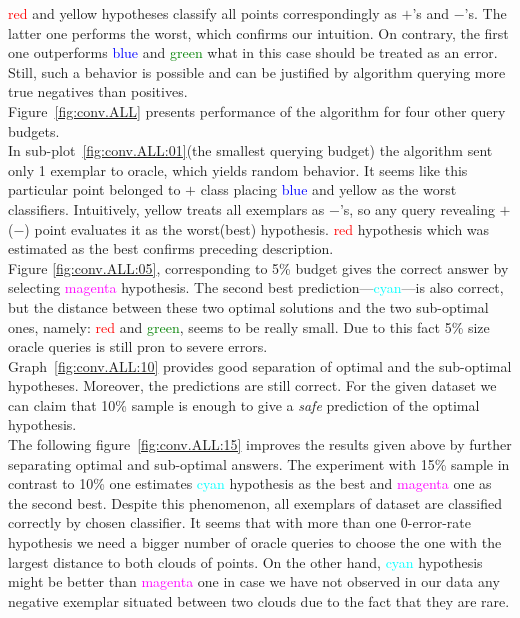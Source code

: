 \documentclass[12pt, a4paper, pdflatex, leqno, twoside]{report}
\begin{document}
\textcolor{red}{red} and \textcolor{Dandelion}{yellow} hypotheses classify all 
points correspondingly as $+$'s and $-$'s. The latter one performs the worst, 
which confirms our intuition. On contrary, the first one outperforms 
\textcolor{blue}{blue} and \textcolor{green}{green} what in this case should be 
treated as an error. Still, such a behavior is possible and can be justified by algorithm 
querying more true negatives than positives.\\

Figure~\ref{fig:conv.ALL} presents performance of the algorithm for four other query budgets.\\ 
In sub-plot~\ref{fig:conv.ALL:01}(the smallest querying 
budget) the algorithm sent only 1 exemplar to oracle, which yields random 
behavior. It seems like this particular point belonged to $+$ class placing 
\textcolor{blue}{blue} and \textcolor{Dandelion}{yellow} as the worst 
classifiers. Intuitively, \textcolor{Dandelion}{yellow} treats all exemplars 
as $-$'s, so any query revealing $+$($-$) point evaluates it as the worst(best) hypothesis. \textcolor{red}{red} hypothesis which was estimated as the best confirms preceding description. \\
Figure \ref{fig:conv.ALL:05}, corresponding to 5\% budget gives the correct 
answer by selecting \textcolor{magenta}{magenta} hypothesis. The second best 
prediction---\textcolor{cyan}{cyan}---is also correct, but the distance between 
these two optimal solutions and the two sub-optimal ones, namely: \textcolor{red}{red} 
and \textcolor{green}{green}, seems to be really small. Due to this fact 5\% 
size oracle queries is still pron to severe errors.\\
Graph~\ref{fig:conv.ALL:10} provides good separation of optimal and the sub-optimal 
hypotheses. Moreover, the predictions are still correct. For the given dataset we 
can claim that 10\% sample is enough to give a \emph{safe} prediction of the 
optimal hypothesis.\\
The following figure~\ref{fig:conv.ALL:15} improves the results given above by 
further separating optimal and sub-optimal answers. The experiment with 15\% sample 
in contrast to 10\% one estimates \textcolor{cyan}{cyan} hypothesis as the best 
and \textcolor{magenta}{magenta} one as the second best. Despite this 
phenomenon, all exemplars of dataset are classified correctly by chosen 
classifier. It seems that with more than one 0-error-rate hypothesis we need 
a bigger number of oracle queries to choose the one with the largest distance to both 
clouds of points. On the other hand, \textcolor{cyan}{cyan} hypothesis might be 
better than \textcolor{magenta}{magenta} one in case we have not observed in 
our data any negative exemplar situated between two clouds due to the fact that 
they are rare.\\
\end{document}
